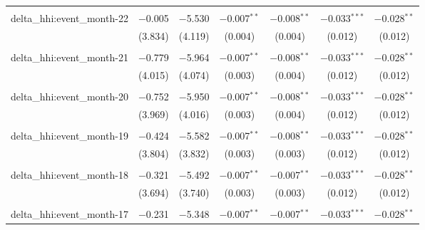 \begin{table}[H]
{\begin{tabular}{@{\extracolsep{5pt}}lcccccc}
   & & & & & & \\  

  delta\_hhi:event\_month-22 & $-$0.005 & $-$5.530 & $-$0.007$^{**}$ & $-$0.008$^{**}$ & $-$0.033$^{***}$ & $-$0.028$^{**}$ \\  

   & (3.834) & (4.119) & (0.004) & (0.004) & (0.012) & (0.012) \\  

   & & & & & & \\  

  delta\_hhi:event\_month-21 & $-$0.779 & $-$5.964 & $-$0.007$^{**}$ & $-$0.008$^{**}$ & $-$0.033$^{***}$ & $-$0.028$^{**}$ \\  

   & (4.015) & (4.074) & (0.003) & (0.004) & (0.012) & (0.012) \\  

   & & & & & & \\  

  delta\_hhi:event\_month-20 & $-$0.752 & $-$5.950 & $-$0.007$^{**}$ & $-$0.008$^{**}$ & $-$0.033$^{***}$ & $-$0.028$^{**}$ \\  

   & (3.969) & (4.016) & (0.003) & (0.004) & (0.012) & (0.012) \\  

   & & & & & & \\  

  delta\_hhi:event\_month-19 & $-$0.424 & $-$5.582 & $-$0.007$^{**}$ & $-$0.008$^{**}$ & $-$0.033$^{***}$ & $-$0.028$^{**}$ \\  

   & (3.804) & (3.832) & (0.003) & (0.003) & (0.012) & (0.012) \\  

   & & & & & & \\  

  delta\_hhi:event\_month-18 & $-$0.321 & $-$5.492 & $-$0.007$^{**}$ & $-$0.007$^{**}$ & $-$0.033$^{***}$ & $-$0.028$^{**}$ \\  

   & (3.694) & (3.740) & (0.003) & (0.003) & (0.012) & (0.012) \\  

   & & & & & & \\  

  delta\_hhi:event\_month-17 & $-$0.231 & $-$5.348 & $-$0.007$^{**}$ & $-$0.007$^{**}$ & $-$0.033$^{***}$ & $-$0.028$^{**}$ \\  


\end{tabular}}
\end{table}
